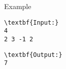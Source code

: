 Example
\begin{verbatim}
\textbf{Input:}
4
2 3 -1 2\end{verbatim}
\begin{verbatim}
\textbf{Output:}
7\end{verbatim}